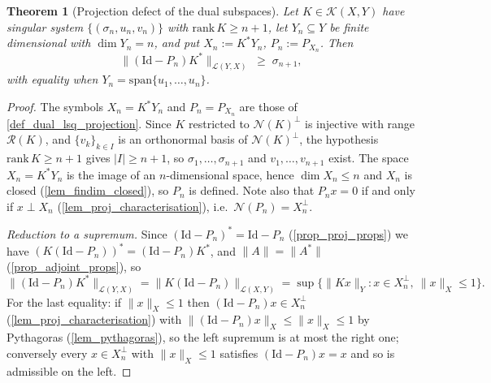 \documentclass[a4paper]{report}
\theoremstyle{plain}
\newtheorem{theorem}{Theorem}[chapter]
\theoremstyle{definition}
\theoremstyle{remark}
\newcommand{\Ll}{\mathcal{L}}
\newcommand{\Kk}{\mathcal{K}}
\newcommand{\Ran}{\mathcal{R}}
\newcommand{\Ker}{\mathcal{N}}
\newcommand{\Id}{\mathrm{Id}}
\begin{document}
\begin{theorem}[Projection defect of the dual subspaces]
  \label{thm_projection_defect}
  Let $K \in \Kk(X,Y)$ have singular system $\{(\sigma_n,u_n,v_n)\}$ with
  $\mathrm{rank}\,K \ge n+1$, let $Y_n \subseteq Y$ be finite dimensional with
  $\dim Y_n = n$, and put
  $X_n := K^{*}Y_n$, $P_n := P_{X_n}$.  Then
  \[
    \bigl\|(\Id - P_n)K^{*}\bigr\|_{\Ll(Y,X)} \;\ge\; \sigma_{n+1} ,
  \]
  with equality when $Y_n = \mathrm{span}\{u_1,\dots,u_n\}$.
\end{theorem}
\begin{proof}
  The symbols $X_n = K^{*}Y_n$ and $P_n = P_{X_n}$ are those of
  \cref{def_dual_lsq_projection}.  Since $K$ restricted to $\Ker(K)^{\perp}$ is
  injective with range $\Ran(K)$, and
  $\{v_k\}_{k \in I}$ is an orthonormal basis of $\Ker(K)^{\perp}$, the hypothesis
  $\mathrm{rank}\,K \ge n+1$ gives $|I| \ge n+1$, so $\sigma_1,\dots,\sigma_{n+1}$ and
  $v_1,\dots,v_{n+1}$ exist.  The space $X_n = K^{*}Y_n$ is the image of an
  $n$-dimensional space, hence $\dim X_n \le n$ and $X_n$ is closed
  (\cref{lem_findim_closed}), so $P_n$ is defined.  Note also that $P_nx = 0$ if and only if
  $x \perp X_n$ (\cref{lem_proj_characterisation}), i.e.\ $\Ker(P_n) = X_n^{\perp}$.

  \emph{Reduction to a supremum.}  Since $(\Id - P_n)^{*} = \Id - P_n$
  (\cref{prop_proj_props}) we have $(K(\Id-P_n))^{*} = (\Id - P_n)K^{*}$, and
  $\|A\| = \|A^{*}\|$ (\cref{prop_adjoint_props}), so
  \begin{equation}\label{eq_pd_norms}
    \bigl\|(\Id - P_n)K^{*}\bigr\|_{\Ll(Y,X)} = \|K(\Id - P_n)\|_{\Ll(X,Y)}
      = \sup\bigl\{\|Kx\|_Y : x \in X_n^{\perp},\ \|x\|_X \le 1\bigr\} .
  \end{equation}
  For the last equality: if $\|x\|_X \le 1$ then $(\Id-P_n)x \in X_n^{\perp}$
  (\cref{lem_proj_characterisation}) with $\|(\Id-P_n)x\|_X \le \|x\|_X \le 1$ by Pythagoras
  (\cref{lem_pythagoras}), so the left supremum is at most the right one; conversely every
  $x \in X_n^{\perp}$ with $\|x\|_X \le 1$ satisfies $(\Id - P_n)x = x$ and so is
  admissible on the left.


\end{proof}
\end{document}
